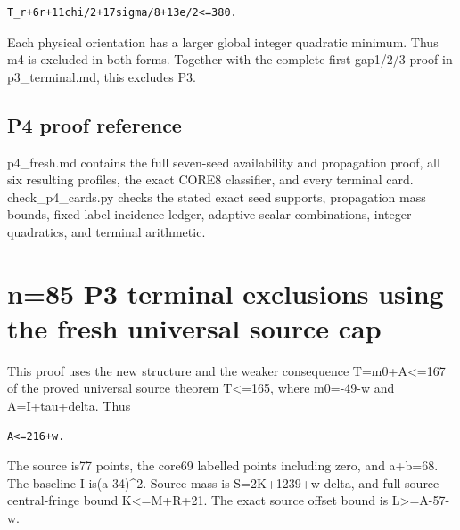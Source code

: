 \documentclass[10pt,a4paper]{article}
\theoremstyle{definition}
\begin{document}
\begin{lstlisting}
T_r+6r+11chi/2+17sigma/8+13e/2<=380.
\end{lstlisting}

Each physical orientation has a larger global integer quadratic minimum.
Thus m4 is excluded in both forms. Together with the complete
first-gap1/2/3 proof in p3\_\allowbreak{}terminal.md,\allowbreak{} this excludes P3.

\hypertarget{p4-proof-reference}{%
\subsection{P4 proof reference}\label{p4-proof-reference}}

p4\_\allowbreak{}fresh.md contains the full seven-seed availability and propagation
proof,\allowbreak{} all six resulting profiles,\allowbreak{} the exact CORE8 classifier,\allowbreak{} and every
terminal card. check\_\allowbreak{}p4\_\allowbreak{}cards.py checks the stated exact seed
supports,\allowbreak{} propagation mass bounds,\allowbreak{} fixed-label incidence ledger,\allowbreak{}
adaptive scalar combinations,\allowbreak{} integer quadratics,\allowbreak{} and terminal
arithmetic.

\clearpage
\hypertarget{n85-p3-terminal-exclusions-using-the-fresh-universal-source-cap}{%
\section{n=\allowbreak{}85 P3 terminal exclusions using the fresh universal source
cap}\label{n85-p3-terminal-exclusions-using-the-fresh-universal-source-cap}}

This proof uses the new structure and the weaker consequence
T=\allowbreak{}m0+\allowbreak{}A\textless=\allowbreak{}167 of the proved universal source theorem
T\textless=\allowbreak{}165,\allowbreak{} where m0=\allowbreak{}-49-w and A=\allowbreak{}I+\allowbreak{}tau+\allowbreak{}delta. Thus

\begin{lstlisting}
A<=216+w.
\end{lstlisting}

The source is77 points,\allowbreak{} the core69 labelled points including zero,\allowbreak{} and
a+\allowbreak{}b=\allowbreak{}68. The baseline I is(a-34)\^{}2. Source mass is S=\allowbreak{}2K+\allowbreak{}1239+\allowbreak{}w-delta,\allowbreak{}
and full-source central-fringe bound K\textless=\allowbreak{}M+\allowbreak{}R+\allowbreak{}21. The exact source
offset bound is L\textgreater=\allowbreak{}A-57-w.
\end{document}

